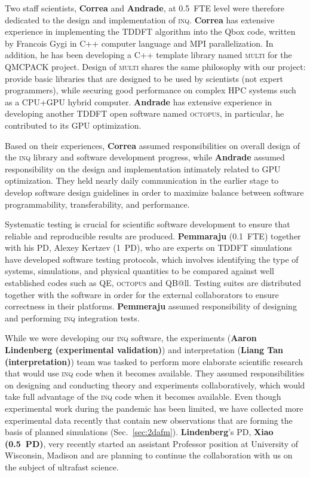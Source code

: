 Two staff scientists, {\bf Correa} and {\bf Andrade}, at 0.5~FTE level were therefore dedicated to the design and implementation of \textsc{inq}. 
{\bf Correa} has extensive experience in implementing the TDDFT algorithm into the Qbox code, written by Francois Gygi in C++ computer language and MPI parallelization. 
In addition, he has been developing a C++ template library named \textsc{multi} for the QMCPACK project.
Design of \textsc{multi} shares the same philosophy with our project: provide basic libraries that are designed to be used by scientists (not expert programmers), while securing good performance on complex HPC systems such as a CPU+GPU hybrid computer. 
{\bf Andrade} has extensive experience in developing another TDDFT open software named \textsc{octopus}, in particular, he contributed to its GPU optimization.  

Based on their experiences, {\bf Correa} assumed responsibilities on overall design of the \textsc{inq} library and software development progress, while {\bf Andrade} assumed responsibility on the design and implementation intimately related to GPU optimization. 
They held nearly daily communication in the earlier stage to develop software design guidelines in order to maximize balance between software programmability, transferability, and performance. 

Systematic testing is crucial for scientific software development to ensure that reliable and reproducible results are produced. 
{\bf Pemmaraju} (0.1~FTE) together with his PD, Alexey Kertzev (1~PD), who are experts on TDDFT simulations have developed software testing protocols, which involves identifying the type of systems, simulations, and physical quantities to be compared against well established codes such as QE, 
\textsc{octopus} and QB@ll. 
Testing suites are distributed together with the software in order for the external collaborators to ensure correctness in their platforms.
{\bf Pemmeraju} assumed responsibility of designing and performing \textsc{inq} integration tests.

While we were developing our \textsc{inq} software, the experiments ({\bf Aaron Lindenberg (experimental validation)}) and interpretation ({\bf Liang Tan (interpretation)}) team was tasked to perform more elaborate scientific research that would use \textsc{inq} code when it becomes available. 
They assumed responsibilities on designing and conducting theory and experiments collaboratively, which would take full advantage of the \textsc{inq} code when it becomes available. Even though experimental work during the pandemic has been limited, we have collected more experimental data recently that contain new observations that are forming the basis of planned simulations (Sec.~\ref{sec:2dafm}). 
{\bf Lindenberg}'s PD, {\bf Xiao (0.5~PD)}, very recently started an assistant Professor position at University of Wisconsin, Madison and are planning to continue the collaboration with us on the subject of ultrafast science.

